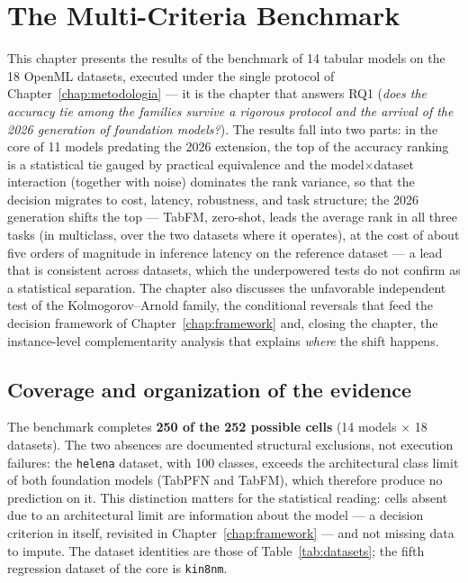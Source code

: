 \chapter{The Multi-Criteria Benchmark}
\label{chap:benchmark}

This chapter presents the results of the benchmark of 14 tabular
models on the 18 OpenML datasets, executed under the single protocol
of Chapter~\ref{chap:metodologia} --- it is the chapter that answers
RQ1 (\emph{does the accuracy tie among the families survive a
rigorous protocol and the arrival of the 2026 generation of
foundation models?}). The results fall into two parts: in the core of
11 models predating the 2026 extension, the top of the accuracy
ranking is a statistical tie gauged by practical equivalence and the
model$\times$dataset interaction (together with noise) dominates the
rank variance, so that the decision migrates to cost, latency,
robustness, and task structure; the 2026 generation shifts the top
--- TabFM, zero-shot, leads the average rank in all three tasks (in
multiclass, over the two datasets where it operates), at the cost of
about five orders of magnitude in inference latency on the
reference dataset --- a lead that
is consistent across datasets, which the underpowered tests do not
confirm as a statistical separation. The chapter also discusses the
unfavorable independent test of the Kolmogorov--Arnold family, the
conditional reversals that feed the decision framework of
Chapter~\ref{chap:framework} and, closing the chapter, the
instance-level complementarity analysis that explains \emph{where}
the shift happens.

\section{Coverage and organization of the evidence}
\label{sec:cap5-cobertura}

The benchmark completes \textbf{250 of the 252 possible cells} (14
models $\times$ 18 datasets). The two absences are documented
structural exclusions, not execution failures: the \texttt{helena}
dataset, with 100 classes, exceeds the architectural class limit of
both foundation models (TabPFN and TabFM), which therefore produce no
prediction on it. This distinction matters for the statistical
reading: cells absent due to an architectural limit are information
about the model --- a decision criterion in itself, revisited in
Chapter~\ref{chap:framework} --- and not missing data to impute. The
dataset identities are those of Table~\ref{tab:datasets}; the fifth
regression dataset of the core is \texttt{kin8nm}.

